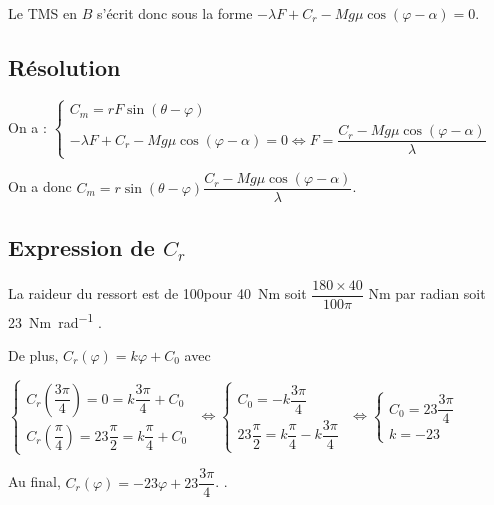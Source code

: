 Le TMS en $B$ s'écrit donc sous la forme 
$-\lambda F + C_r-Mg \mu \cos\left( \varphi - \alpha \right) = 0$.

\subsection{Résolution}

On a :
$\left\{
\begin{array}{l}
C_m=rF\sin\left( \theta-\varphi\right) \\
-\lambda F + C_r-Mg \mu \cos\left( \varphi - \alpha \right) = 0 \Leftrightarrow  F=  \dfrac{C_r-Mg \mu \cos\left( \varphi - \alpha \right)}{\lambda} 
\end{array}
\right.
$

On a donc $C_m=r\sin\left( \theta-\varphi\right) \dfrac{C_r-Mg \mu \cos\left( \varphi - \alpha \right)}{\lambda} $.

\subsection{Expression de $C_r$}
La raideur du ressort est de 100\degres pour \SI{40}{Nm} soit $\dfrac{180\times 40}{100 \pi}$ Nm par radian soit \SI{23}{Nm.rad^{-1}} .

De plus, 
$C_r (\varphi) = k\varphi + C_0$
avec  

$\left\{
\begin{array}{l}
C_r\left(\dfrac{3\pi}{4}\right) = 0 =  k\dfrac{3\pi}{4}+ C_0 \\
C_r\left(\dfrac{\pi}{4}\right) =23 \dfrac{\pi}{2}=  k\dfrac{\pi}{4}+ C_0 
\end{array}
\right.$
$ \Leftrightarrow \left\{
\begin{array}{l}
C_0 = - k\dfrac{3\pi}{4}  \\
23 \dfrac{\pi}{2}=  k\dfrac{\pi}{4}- k\dfrac{3\pi}{4} 
\end{array}
\right.$
$ \Leftrightarrow \left\{
\begin{array}{l}
C_0 = 23 \dfrac{3\pi}{4}  \\
k  = -23
\end{array}
\right.$

Au final, $C_r (\varphi) =-23\varphi + 23 \dfrac{3\pi}{4}$.
.


\begin{thebibliography}{2}
\end{thebibliography}






